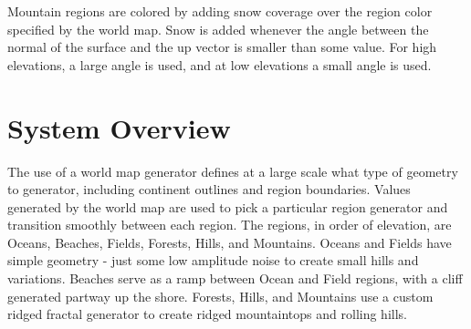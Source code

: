 Mountain regions are colored by adding snow coverage over the region color specified by the world map.
Snow is added whenever the angle between the normal of the surface and the up vector is smaller than some value.
For high elevations, a large angle is used, and at low elevations a small angle is used.

\section{System Overview}

The use of a world map generator defines at a large scale what type of geometry to generator, including continent outlines and region boundaries.
Values generated by the world map are used to pick a particular region generator and transition smoothly between each region.
The regions, in order of elevation, are Oceans, Beaches, Fields, Forests, Hills, and Mountains.
Oceans and Fields have simple geometry - just some low amplitude noise to create small hills and variations.
Beaches serve as a ramp between Ocean and Field regions, with a cliff generated partway up the shore.
Forests, Hills, and Mountains use a custom ridged fractal generator to create ridged mountaintops and rolling hills.
